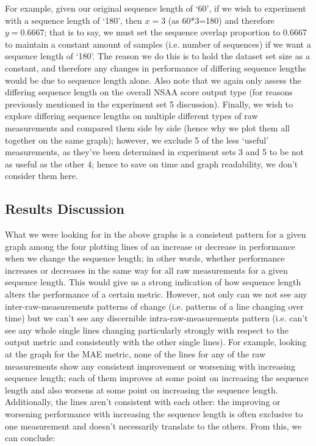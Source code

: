 \documentclass[12pt,twoside]{report}
\begin{document}
\quad For example, given our original sequence length of ‘60’, if we wish to experiment with a sequence length of ‘180’, then $x=3$ (as 60*3=180) and therefore $y=0.6667$; that is to say, we must set the sequence overlap proportion to 0.6667 to maintain a constant amount of samples (i.e. number of sequences) if we want a sequence length of ‘180’. The reason we do this is to hold the dataset set size as a constant, and therefore any changes in performance of differing sequence lengths would be due to sequence length alone. Also note that we again only assess the differing sequence length on the overall NSAA score output type (for reasons previously mentioned in the experiment set 5 discussion). Finally, we wish to explore differing sequence lengths on multiple different types of raw measurements and compared them side by side (hence why we plot them all together on the same graph); however, we exclude 5 of the less ‘useful’ measurements, as they’ve been determined in experiment sets 3 and 5 to be not as useful as the other 4; hence to save on time and graph readability, we don’t consider them here.

\subsection{Results Discussion}

\quad What we were looking for in the above graphs is a consistent pattern for a given graph among the four plotting lines of an increase or decrease in performance when we change the sequence length; in other words, whether performance increases or decreases in the same way for all raw measurements for a given sequence length. This would give us a strong indication of how sequence length alters the performance of a certain metric. However, not only can we not see any inter-raw-measurements patterns of change (i.e. patterns of a line changing over time) but we can’t see any discernible intra-raw-measurements pattern (i.e. can’t see any whole single lines changing particularly strongly with respect to the output metric and consistently with the other single lines). For example, looking at the graph for the MAE metric, none of the lines for any of the raw measurements show any consistent improvement or worsening with increasing sequence length; each of them improves at some point on increasing the sequence length and also worsens at some point on increasing the sequence length. Additionally, the lines aren’t consistent with each other: the improving or worsening performance with increasing the sequence length is often exclusive to one measurement and doesn’t necessarily translate to the others. From this, we can conclude:
\end{document}
